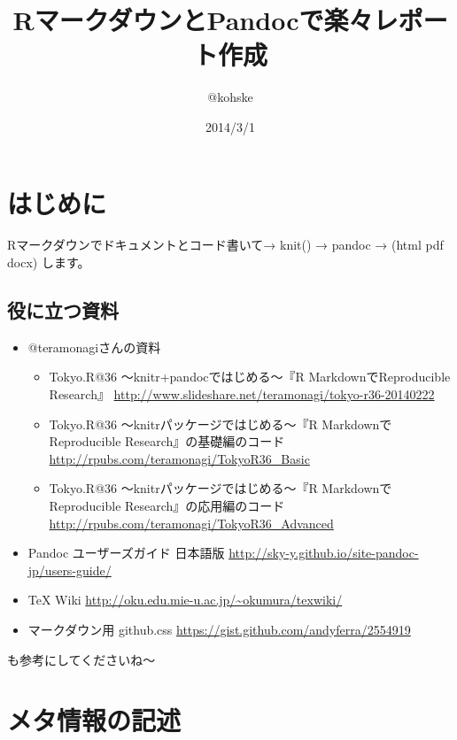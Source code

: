 \documentclass[]{ltjarticle}
\title{RマークダウンとPandocで楽々レポート作成}
\author{@kohske}
\date{2014/3/1}
\begin{document}
\maketitle

{
\hypersetup{linkcolor=black}
\setcounter{tocdepth}{3}
\tableofcontents
}
\section{はじめに}\label{ux306fux3058ux3081ux306b}

Rマークダウンでドキュメントとコード書いて→ knit() → pandoc → (html
\textbar{} pdf \textbar{} docx) します。

\subsection{役に立つ資料}\label{ux5f79ux306bux7acbux3064ux8cc7ux6599}

\begin{itemize}
\itemsep1pt\parskip0pt
\item
  @teramonagiさんの資料

  \begin{itemize}
  \itemsep1pt\parskip0pt
  \item
    Tokyo.R@36 ～knitr+pandocではじめる～『R MarkdownでReproducible
    Research』
    \url{http://www.slideshare.net/teramonagi/tokyo-r36-20140222}
  \item
    Tokyo.R@36 ～knitrパッケージではじめる～『R MarkdownでReproducible
    Research』の基礎編のコード
    \url{http://rpubs.com/teramonagi/TokyoR36_Basic}
  \item
    Tokyo.R@36 ～knitrパッケージではじめる～『R MarkdownでReproducible
    Research』の応用編のコード
    \url{http://rpubs.com/teramonagi/TokyoR36_Advanced}
  \end{itemize}
\item
  Pandoc ユーザーズガイド 日本語版
  \url{http://sky-y.github.io/site-pandoc-jp/users-guide/}
\item
  TeX Wiki \url{http://oku.edu.mie-u.ac.jp/~okumura/texwiki/}
\item
  マークダウン用 github.css
  \url{https://gist.github.com/andyferra/2554919}
\end{itemize}

も参考にしてくださいね〜

\section{メタ情報の記述}\label{ux30e1ux30bfux60c5ux5831ux306eux8a18ux8ff0}
\end{document}

